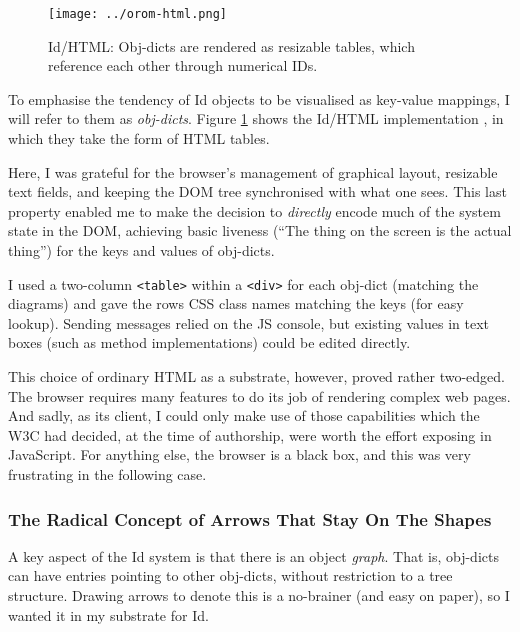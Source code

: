 \begin{figure}[h]
  \centering
  \texttt{[image: ../orom-html.png]}
  \caption{Id{}/HTML: Obj-dicts are rendered as resizable tables, which reference
           each other through numerical IDs. \label{fig:orom-html}}
\end{figure}

To emphasise the tendency of Id{} objects to be visualised as key-value
mappings, I will refer to them as \emph{obj-dicts}. Figure
\ref{fig:orom-html} shows the Id{}/HTML implementation \cite{orom-html},
in which they take the form of HTML tables.

Here, I was grateful for the browser's management of graphical layout,
resizable text fields, and keeping the DOM tree synchronised with what
one sees. This last property enabled me to make the decision to
\emph{directly} encode much of the system state in the DOM, achieving
basic liveness (``The thing on the screen is the actual thing'') for the
keys and values of obj-dicts.

I used a two-column \texttt{\textless{}table\textgreater{}} within a
\texttt{\textless{}div\textgreater{}} for each obj-dict (matching the
diagrams) and gave the rows CSS class names matching the keys (for easy
lookup). Sending messages relied on the JS console, but existing values
in text boxes (such as method implementations) could be edited directly.

This choice of ordinary HTML as a substrate, however, proved rather
two-edged. The browser requires many features to do its job of rendering
complex web pages. And sadly, as its client, I could only make use of
those capabilities which the W3C had decided, at the time of authorship,
were worth the effort exposing in JavaScript. For anything else, the
browser is a black box, and this was very frustrating in the following
case.

\hypertarget{the-radical-concept-of-arrows-that-stay-on-the-shapes}{%
\subsubsection{The Radical Concept of Arrows That Stay On The
Shapes}\label{the-radical-concept-of-arrows-that-stay-on-the-shapes}}

A key aspect of the Id{} system is that there is an object \emph{graph}.
That is, obj-dicts can have entries pointing to other obj-dicts, without
restriction to a tree structure. Drawing arrows to denote this is a
no-brainer (and easy on paper), so I wanted it in my substrate for Id{}.

